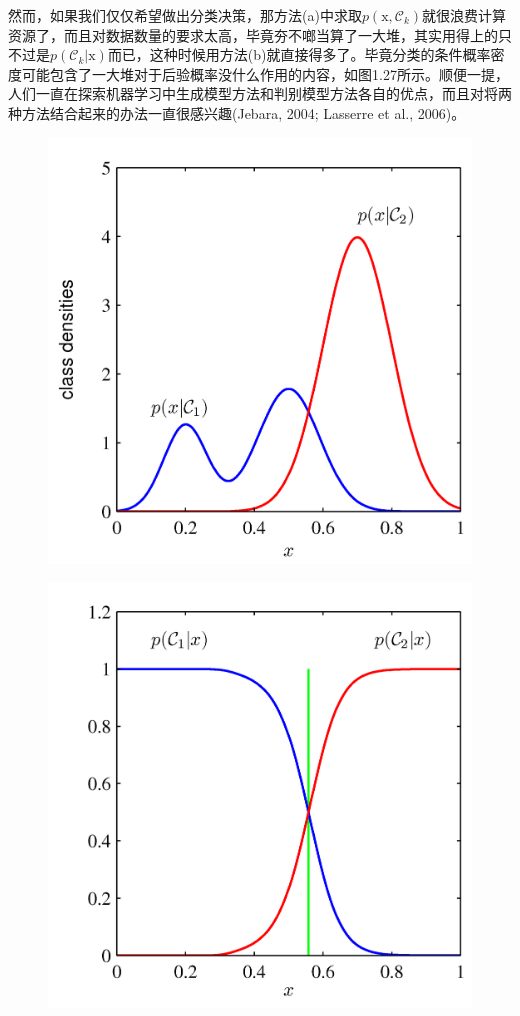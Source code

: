 \documentclass[b5paper]{book}
\numberwithin{equation}{chapter}
\begin{document}
{	\indent 然而，如果我们仅仅希望做出分类决策，那方法(a)中求取$p(\boldsymbol{\mathrm{x}},\mathcal{C}_k)$就很浪费计算资源了，而且对数据数量的要求太高，毕竟夯不啷当算了一大堆，其实用得上的只不过是$p(\mathcal{C}_k|\boldsymbol{\mathrm{x}})$而已，这种时候用方法(b)就直接得多了。毕竟分类的条件概率密度可能包含了一大堆对于后验概率没什么作用的内容，如图1.27所示。顺便一提，人们一直在探索机器学习中生成模型方法和判别模型方法各自的优点，而且对将两种方法结合起来的办法一直很感兴趣(Jebara, 2004; Lasserre et al., 2006)。
	\begin{figure}[ht]
		\begin{minipage}[t]{0.5\linewidth}
		\includegraphics[scale=0.8]{Images/1-27a.png}
		\label{fig:1-27a}
		\end{minipage}
		\begin{minipage}[t]{0.5\linewidth}
		\includegraphics[scale=0.8]{Images/1-27b.png}

\end{minipage}
\end{figure}}
\end{document}
